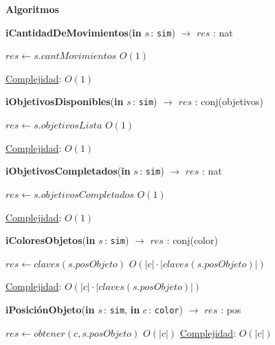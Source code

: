 \documentclass[a4paper,10pt]{article}
\let\TipoVariable=\texttt
\let\ModificadorArgumento=\textbf
\newcommand{\In}[2]{\ModificadorArgumento{in} \ensuremath{#1}\,: \TipoVariable{#2}\xspace}
\newenvironment{Algoritmos}{%
  \vspace*{2ex}%
  \noindent\textbf{\Large Algoritmos}%
  \vspace*{2ex}%
}{}
\begin{document}
\begin{Algoritmos}
\begin{algorithm}[H]{\textbf{iCantidadDeMovimientos}(\In{s}{sim}) $\to$ $res$ : nat}
      \begin{algorithmic}[1]
       \State $res \gets s.cantMovimientos$   \Comment $O(1)$
       
      \medskip
      \Statex \underline{Complejidad}: $O(1)$
      \end{algorithmic}
\end{algorithm} 

\begin{algorithm}[H]{\textbf{iObjetivosDisponibles}(\In{s}{sim}) $\to$ $res$ : conj(objetivos)}
      \begin{algorithmic}[1]
       \State $res \gets s.objetivosLista$   \Comment $O(1)$
       
      \medskip
      \Statex \underline{Complejidad}: $O(1)$
      \end{algorithmic}
\end{algorithm} 

\begin{algorithm}[H]{\textbf{iObjetivosCompletados}(\In{s}{sim}) $\to$ $res$ : nat}
      \begin{algorithmic}[1]
       \State $res \gets s.objetivosCompletados$   \Comment $O(1)$
       
      \medskip
      \Statex \underline{Complejidad}: $O(1)$
      \end{algorithmic}
\end{algorithm} 

\begin{algorithm}[H]{\textbf{iColoresObjetos}(\In{s}{sim}) $\to$ $res$ : conj(color)}
      \begin{algorithmic}[1]
      \State $res \gets claves(s.posObjeto)$      \Comment $O(|c|\cdot |claves(s.posObjeto)|)$  
       
      \medskip
      \Statex \underline{Complejidad}: $O(|c|\cdot |claves(s.posObjeto)|)$
      \end{algorithmic}
\end{algorithm} 

\begin{algorithm}[H]{\textbf{iPosiciónObjeto}(\In{s}{sim}, \In{c}{color}) $\to$ $res$ : pos}
      \begin{algorithmic}[1]
       \State $res \gets obtener(c, s.posObjeto)$   \Comment $O(|c|)$
      \medskip
      \Statex \underline{Complejidad}: $O(|c|)$
      \end{algorithmic}
\end{algorithm} 



\end{Algoritmos}
\end{document}
